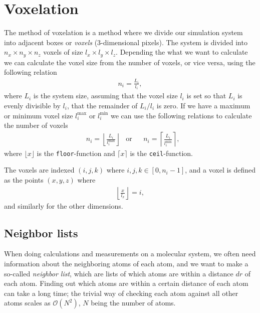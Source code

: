 \section{Voxelation\label{sec:voxelation}}
The method of voxelation is a method where we divide our simulation system into adjacent boxes or \emph{voxels} (3-dimensional pixels). The system is divided into $n_x\times n_y\times n_z$ voxels of size $l_x\times l_y\times l_z$. Depending the what we want to calculate we can calculate the voxel size from the number of voxels, or vice versa, using the following relation
\begin{align*}
    n_i = \frac{L_i}{l_i},
\end{align*}
where $L_i$ is the system size, assuming that the voxel size $l_i$ is set so that $L_i$ is evenly divisible by $l_i$, that the remainder of $L_i/l_i$ is zero. If we have a maximum or minimum voxel size $l_i^\text{max}$ or $l_i^\text{min}$ we can use the following relations to calculate the number of voxels
\begin{align*}
    &n_i=\left\lfloor\frac{L_i}{l_i^\text{max}}\right\rfloor &\text{or}& &n_i=\left\lceil\frac{L_i}{l_i^\text{min}}\right\rceil,
\end{align*}
where $\lfloor x \rfloor$ is the \Verb!floor!-function and $\lceil x \rceil$ is the \Verb!ceil!-function.

The voxels are indexed $(i,j,k)$ where $i,j,k \in [0,n_i-1]$, and a voxel is defined as the points $(x,y,z)$ where
\begin{align}
    \left\lfloor\frac{x}{l_x}\right\rfloor = i,\label{eq:find_voxel_index}
\end{align}
and similarly for the other dimensions.

\subsection{Neighbor lists\label{sec:neighbor_lists}}
When doing calculations and measurements on a molecular system, we often need information about the neighboring atoms of each atom, and we want to make a so-called \emph{neighbor list}, which are lists of which atoms are within a distance $dr$ of each atom. Finding out which atoms are within a certain distance of each atom can take a long time; the trivial way of checking each atom against all other atoms scales as $\mathcal{O}(N^2)$, $N$ being the number of atoms. 
%

